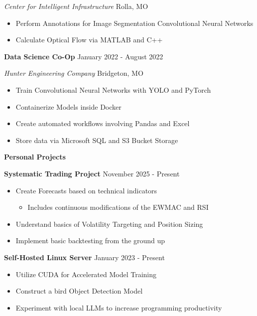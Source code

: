 \documentclass[11pt]{article}
\begin{document}
\textsl{Center for Intelligent Infrastructure} \hfill Rolla, MO
\begin{itemize}[noitemsep, topsep=0pt, partopsep=0pt, parsep=0pt, itemsep=0pt]
    \item Perform Annotations for Image Segmentation Convolutional Neural Networks
    \item Calculate Optical Flow via MATLAB and C++
\end{itemize}


\textbf{Data Science Co-Op} \hfill January 2022 - August 2022

\textsl{Hunter Engineering Company} \hfill Bridgeton, MO
\begin{itemize}[noitemsep, topsep=0pt, partopsep=0pt, parsep=0pt, itemsep=0pt]
    \item Train Convolutional Neural Networks with YOLO and PyTorch
    \item Containerize Models inside Docker
    \item Create automated workflows involving Pandas and Excel
    \item Store data via Microsoft SQL and S3 Bucket Storage
\end{itemize}


\begin{center}
    \textbf{Personal Projects}
\end{center}

\textbf{Systematic Trading Project} \hfill November 2025 - Present
\begin{itemize}[noitemsep, topsep=0pt, partopsep=0pt, parsep=0pt, itemsep=0pt]
    \item Create Forecasts based on technical indicators
    \begin{itemize}[noitemsep, topsep=0pt, partopsep=0pt, parsep=0pt, itemsep=0pt]
        \item Includes continuous modifications of the EWMAC and RSI
    \end{itemize}
    \item Understand basics of Volatility Targeting and Position Sizing
    \item Implement basic backtesting from the ground up
\end{itemize}

\textbf{Self-Hosted Linux Server} \hfill January 2023 - Present
\begin{itemize}[noitemsep, topsep=0pt, partopsep=0pt, parsep=0pt, itemsep=0pt]
    \item Utilize CUDA for Accelerated Model Training
    \item Construct a bird Object Detection Model
    \item Experiment with local LLMs to increase programming productivity
\end{itemize}
\end{document}
